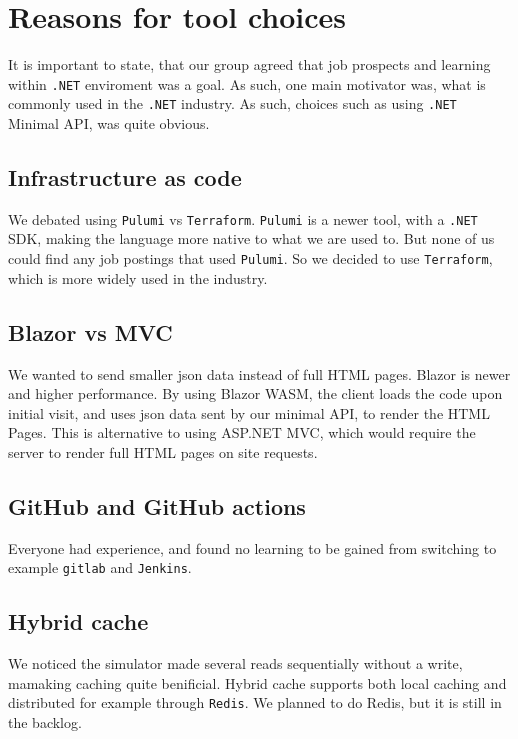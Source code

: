 \section{Reasons for tool choices}
\label{appn:C}
It is important to state, that our group agreed that 
job prospects and learning within \texttt{.NET} enviroment was a goal.
As such, one main motivator was, what is commonly used in 
the \texttt{.NET} industry.
As such, choices such as using \texttt{.NET} Minimal API,
was quite obvious.

\subsection{Infrastructure as code}

We debated using \texttt{Pulumi}\cite{pulumi} vs \texttt{Terraform}.
\texttt{Pulumi} is a newer tool, with a \texttt{.NET} SDK, 
making the language more native to what we are used to.
But none of us could find any job postings that used \texttt{Pulumi}.
So we decided to use \texttt{Terraform}, which is more widely used 
in the industry.


\subsection{Blazor vs MVC}
We wanted to send smaller json data instead of full HTML pages. 
Blazor is newer and higher performance. By using Blazor WASM, 
the client loads the code upon initial visit,
and uses json data sent by our minimal API, to render the HTML Pages.
This is alternative to using ASP.NET MVC, which would require the server
to render full HTML pages on site requests.

\subsection{GitHub and GitHub actions}
Everyone had experience, and found no learning to be 
gained from switching to example \texttt{gitlab} and \texttt{Jenkins}.

\subsection{Hybrid cache}
We noticed the simulator made several reads sequentially without a write, 
mamaking caching quite benificial. Hybrid cache supports both local 
caching and distributed for example through \texttt{Redis}\cite{redis}. 
We planned to do Redis, but it is still in the backlog.

